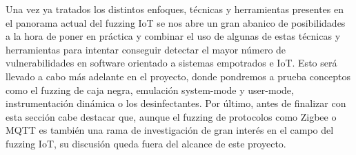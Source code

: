 Una vez ya tratados los distintos enfoques, técnicas y herramientas presentes en el panorama actual del fuzzing IoT se nos abre un gran abanico de 
posibilidades a la hora de poner en práctica y combinar el uso de algunas de estas técnicas y herramientas para intentar conseguir detectar el mayor 
número de vulnerabilidades en software orientado a sistemas empotrados e IoT. Esto será llevado a cabo más adelante en el proyecto, donde pondremos a prueba 
conceptos como el fuzzing de caja negra, emulación system-mode y user-mode, instrumentación dinámica o los desinfectantes. Por último, antes de finalizar con
esta sección cabe destacar que, aunque el fuzzing de protocolos como Zigbee o MQTT es también una rama de investigación de gran interés en el campo del
fuzzing IoT, su discusión queda fuera del alcance de este proyecto.

\bigskip
